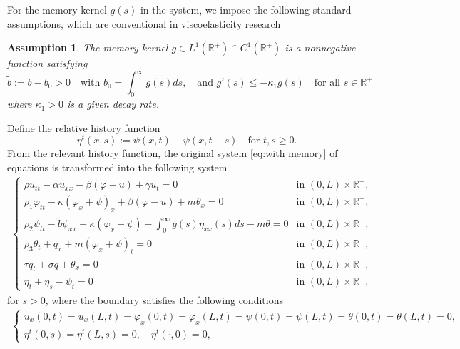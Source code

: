 \documentclass[11pt,reqno]{article}
\newtheorem{assumption}[theorem]{Assumption}
\newcommand{\dt}{\tilde}
\begin{document}
For the memory kernel $g(s)$ in the system, we impose the following standard assumptions, which are conventional in viscoelasticity research

\begin{assumption}\label{assumg}
 The memory kernel $g \in L^1(\mathbb{R}^+) \cap C^1(\mathbb{R}^+)$ is a nonnegative function satisfying
 \begin{equation}\label{g}
		\dt b := b - b_0 > 0 \quad \text{with } b_0 = \int_{0}^{\infty} g(s) ds, \quad \text{and } g'(s) \leq -\kappa_1 g(s) \quad \text{for all } s\in\mathbb{R}^+
	\end{equation}
	where $\kappa_1 > 0$ is a given decay rate.
\end{assumption}

Define the relative history function
\begin{equation*}
	\eta^t(x,s) := \psi(x,t) - \psi(x,t-s) \quad \text{for } t,s \geq 0.
\end{equation*}
From the relevant history function, the original system \eqref{eq:with memory} of equations is transformed into the following system
\begin{align}
	\begin{cases}
		\rho u_{tt} - \alpha u_{xx} - \beta(\varphi - u) + \gamma u_t = 0 & \text{in } (0,L) \times \mathbb{R}^+, \\
		\rho_1 \varphi_{tt} - \kappa(\varphi_x + \psi)_x + \beta (\varphi - u) + m \theta_x = 0 & \text{in } (0,L) \times \mathbb{R}^+, \\
		\rho_2 \psi_{tt} - \dt b \psi_{xx} + \kappa(\varphi_x + \psi) - \int_0^\infty g(s) \eta_{xx}(s)  ds - m \theta = 0 & \text{in } (0,L) \times \mathbb{R}^+, \\
		\rho_3 \theta_t + q_x + m (\varphi_x + \psi)_t = 0 & \text{in } (0,L) \times \mathbb{R}^+, \\
		\tau q_t + \sigma q + \theta_x = 0& \text{in } (0,L) \times \mathbb{R}^+,\\
		\eta_t + \eta_s - \psi_t = 0& \text{in } (0,L) \times \mathbb{R}^+,
	\end{cases}
\end{align}
for $s>0$, where the boundary satisfies the following conditions
\begin{align}\label{with memory:boundary condition}
	\begin{cases}
		u_x(0,t) = u_x(L,t) = \varphi_x(0,t) = \varphi_x(L,t) = \psi(0,t) = \psi(L,t) = \theta(0,t) = \theta(L,t) = 0, \\
		\eta^t(0,s) = \eta^t(L,s) = 0, \quad \eta^t(\cdot,0) = 0,
	\end{cases}
\end{align}
\end{document}
